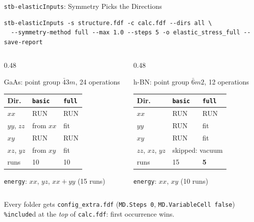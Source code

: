 \documentclass[8pt]{beamer}
\begin{document}
\begin{frame}[fragile]{\texttt{stb-elasticInputs}: Symmetry Picks the Directions}
	\relax
	{\scriptsize
\begin{verbatim}
stb-elasticInputs -s structure.fdf -c calc.fdf --dirs all \
  --symmetry-method full --max 1.0 --steps 5 -o elastic_stress_full --save-report
\end{verbatim}
	}
	\begin{columns}[T]
		\begin{column}{0.48\textwidth}
			\begin{block}{GaAs: point group $\bar{4}3m$, 24 operations}
				\centering\scriptsize
				\begin{tabular}{lll}
					\toprule
					Dir. & \texttt{basic} & \texttt{full} \\
					\midrule
					$xx$ & RUN & RUN \\
					$yy$, $zz$ & from $xx$ & fit \\
					$xy$ & RUN & RUN \\
					$xz$, $yz$ & from $xy$ & fit \\
					\midrule
					runs & 10 & 10 \\
					\bottomrule
				\end{tabular}
				\par\vspace{0.1cm}
				\texttt{energy}: $xx$, $yz$, $xx{+}yy$ (15 runs)
			\end{block}
		\end{column}
		\begin{column}{0.48\textwidth}
			\begin{block}{h-BN: point group $\bar{6}m2$, 12 operations}
				\centering\scriptsize
				\begin{tabular}{lll}
					\toprule
					Dir. & \texttt{basic} & \texttt{full} \\
					\midrule
					$xx$ & RUN & RUN \\
					$yy$ & RUN & fit \\
					$xy$ & RUN & fit \\
					$zz$, $xz$, $yz$ & \multicolumn{2}{l}{skipped: vacuum} \\
					\midrule
					runs & 15 & \textbf{5} \\
					\bottomrule
				\end{tabular}
				\par\vspace{0.1cm}
				\texttt{energy}: $xx$, $xy$ (10 runs)
			\end{block}
		\end{column}
	\end{columns}
	\vspace{0.1cm}
	{\scriptsize Every folder gets \texttt{config\_extra.fdf} (\texttt{MD.Steps 0},
	\texttt{MD.VariableCell false}) \texttt{\%include}d at the \emph{top} of \texttt{calc.fdf}:
	first occurrence wins.}
\end{frame}
\end{document}
